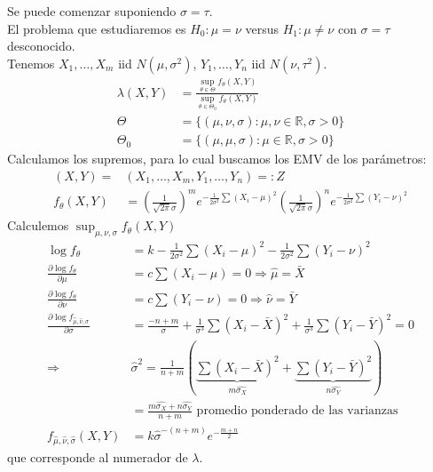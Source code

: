 \documentclass[10pt]{article}
\theoremstyle{plain}
\theoremstyle{definition}
\begin{document}
Se puede comenzar suponiendo $\sigma =\tau$.\\

El problema que estudiaremos es $H_{0}: \mu=\nu$ versus $H_{1}:\mu \not = \nu$ con $\sigma=\tau$ desconocido.\\

Tenemos $X_{1},\ldots,X_{m}$ iid $N(\mu,\sigma^2)$, $Y_{1},\ldots,Y_{n}$ iid $N(\nu,\tau^2)$.\\

\begin{align*}
\lambda(X,Y) &= \frac{\sup_{\theta \in \Theta}f_{\theta}(X,Y)}{\sup_{\theta \in \Theta_{0}}f_{\theta}(X,Y)}\\
\Theta &= \{(\mu,\nu,\sigma)\colon \mu,\nu \in \mathbb{R}, \sigma>0\}\\
\Theta_{0} &= \{(\mu,\mu,\sigma)\colon \mu \in \mathbb{R}, \sigma>0\}
\end{align*} 
Calculamos los supremos, para lo cual buscamos los EMV de los parámetros:
\begin{align*}
(X,Y) =& (X_{1},\ldots,X_{m},Y_{1},\ldots,Y_{n}) =: Z\\
f_{\theta}(X,Y) &= \left(\frac{1}{\sqrt{2\pi}\sigma}\right)^me^{-\frac{1}{2\sigma^2}\sum (X_{i}-\mu)^2} \left(\frac{1}{\sqrt{2\pi}\sigma}\right)^ne^{-\frac{1}{2\sigma^2}\sum (Y_{i}-\nu)^2}
\end{align*}
Calculemos $\sup_{\mu,\nu,\sigma}f_{\theta}(X,Y)$
\begin{align*}
\log f_{\theta} &= k - \frac{1}{2\sigma^2}\sum (X_{i}-\mu)^2 - \frac{1}{2\sigma^2}\sum (Y_{i}-\nu)^2\\
\frac{\partial \log f_{\theta}}{\partial \mu} &= c\sum(X_{i}-\mu) = 0 \Rightarrow \hat{\mu} = \bar{X}\\
\frac{\partial \log f_{\theta}}{\partial \nu} &= c\sum(Y_{i}-\nu) = 0 \Rightarrow \hat{\nu} = \bar{Y}\\
\frac{\partial \log f_{\hat{\mu},\hat{\nu},\sigma}}{\partial \sigma} &= \frac{-n+m}{\sigma} + \frac{1}{\sigma^3}\sum (X_{i}-\bar{X})^2 + \frac{1}{\sigma^3}\sum (Y_{i}-\bar{Y})^2 = 0\\
\Rightarrow & \hat{\sigma}^2 = \frac{1}{n+m}\left(\underbrace{\sum (X_{i}-\bar{X})^2}_{m\hat{\sigma_{X}}} + \underbrace{\sum (Y_{i}-\bar{Y})^2}_{n\hat{\sigma_{Y}}}\right)\\
&= \frac{m\hat{\sigma_{X}}+n\hat{\sigma_{Y}}}{n+m} \text{ promedio ponderado de las varianzas}\\
f_{\hat{\mu},\hat{\nu},\hat{\sigma}}(X,Y) &= k\hat{\sigma}^{-(n+m)}e^{-\frac{m+n}{2}}
\end{align*}
que corresponde al numerador de $\lambda$.\\
\end{document}
